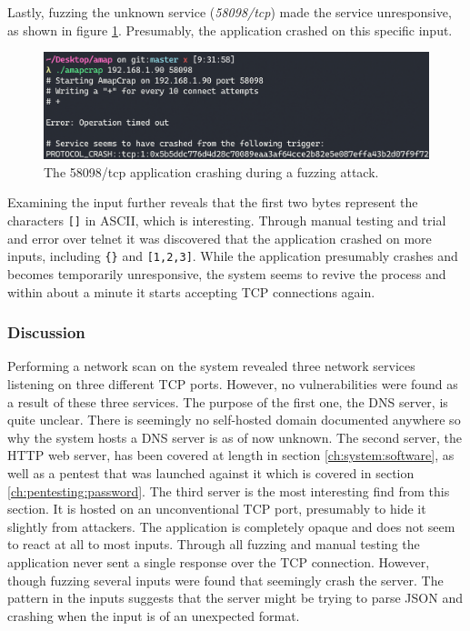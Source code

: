 Lastly, fuzzing the unknown service (\textit{58098/tcp}) made the service unresponsive, as shown in figure \ref{fig:amapcrap-fuzz-attack}. Presumably, the application crashed on this specific input.
\begin{figure}[!ht]
    \centering
    \includegraphics[width=\textwidth]{images/6-pentesting/amapcrap-fuzz-crash.png}
    \caption{The 58098/tcp application crashing during a fuzzing attack.}
    \label{fig:amapcrap-fuzz-attack}
\end{figure}
Examining the input further reveals that the first two bytes represent the characters \texttt{[]} in ASCII, which is interesting. Through manual testing and trial and error over telnet it was discovered that the application crashed on more inputs, including \texttt{\{\}} and \texttt{[1,2,3]}. While the application presumably crashes and becomes temporarily unresponsive, the system seems to revive the process and within about a minute it starts accepting TCP connections again.

\subsubsection{Discussion}
Performing a network scan on the system revealed three network services listening on three different TCP ports. However, no vulnerabilities were found as a result of these three services. The purpose of the first one, the DNS server, is quite unclear. There is seemingly no self-hosted domain documented anywhere so why the system hosts a DNS server is as of now unknown. The second server, the HTTP web server, has been covered at length in section \ref{ch:system:software}, as well as a pentest that was launched against it which is covered in section \ref{ch:pentesting:password}. The third server is the most interesting find from this section. It is hosted on an unconventional TCP port, presumably to hide it slightly from attackers. The application is completely opaque and does not seem to react at all to most inputs. Through all fuzzing and manual testing the application never sent a single response over the TCP connection. However, though fuzzing several inputs were found that seemingly crash the server. The pattern in the inputs suggests that the server might be trying to parse JSON and crashing when the input is of an unexpected format.

